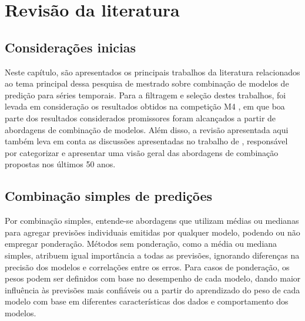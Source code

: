 \chapter{Revisão da literatura }\label{chp:revisao}

\section{Considerações inicias}
Neste capítulo, são apresentados os principais trabalhos da literatura relacionados ao tema principal dessa pesquisa de mestrado sobre combinação de modelos de predição para séries temporais. Para a filtragem e seleção destes trabalhos, foi levada em consideração os resultados obtidos na competição M4 \citep{m4competition}, em que boa parte dos resultados considerados promissores foram alcançados a partir de abordagens de combinação de modelos. Além disso, a revisão apresentada aqui também leva em conta as discussões apresentadas no trabalho de \citet{wang2023forecast}, responsável por categorizar e apresentar uma visão geral das abordagens de combinação propostas nos últimos 50 anos. %

\section{Combinação simples de predições}
Por combinação simples, entende-se abordagens que utilizam médias ou medianas para agregar previsões individuais emitidas por qualquer modelo, podendo ou não empregar ponderação. Métodos sem ponderação, como a média ou mediana simples, atribuem igual importância a todas as previsões, ignorando diferenças na precisão dos modelos e correlações entre os erros. Para casos de ponderação, os pesos podem ser definidos com base no desempenho de cada modelo, dando maior influência às previsões mais confiáveis ou a partir do aprendizado do peso de cada modelo com base em diferentes características dos dados e comportamento dos modelos.

